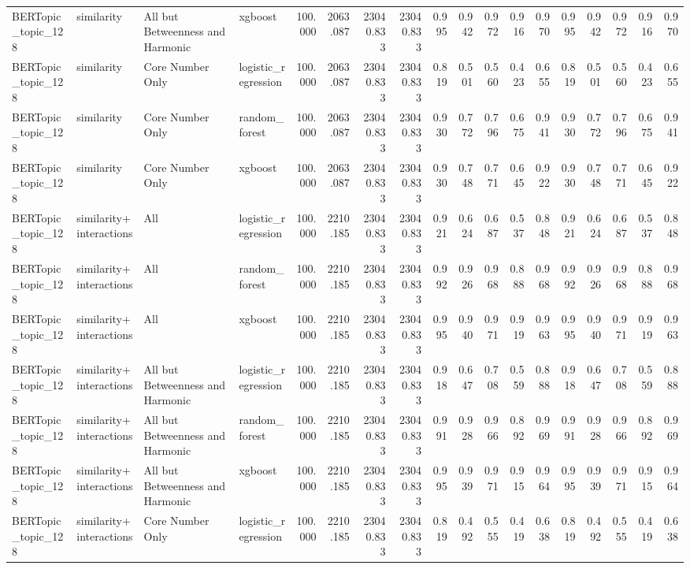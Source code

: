 \begin{tabular}{llllrrrrrrrrrrrrrr}
BERTopic_topic_128 & similarity & All but Betweenness and Harmonic & xgboost & 100.000 & 2063.087 & 23040.833 & 23040.833 & 0.995 & 0.942 & 0.972 & 0.916 & 0.970 & 0.995 & 0.942 & 0.972 & 0.916 & 0.970 \\
BERTopic_topic_128 & similarity & Core Number Only & logistic_regression & 100.000 & 2063.087 & 23040.833 & 23040.833 & 0.819 & 0.501 & 0.560 & 0.423 & 0.655 & 0.819 & 0.501 & 0.560 & 0.423 & 0.655 \\
BERTopic_topic_128 & similarity & Core Number Only & random_forest & 100.000 & 2063.087 & 23040.833 & 23040.833 & 0.930 & 0.772 & 0.796 & 0.675 & 0.941 & 0.930 & 0.772 & 0.796 & 0.675 & 0.941 \\
BERTopic_topic_128 & similarity & Core Number Only & xgboost & 100.000 & 2063.087 & 23040.833 & 23040.833 & 0.930 & 0.748 & 0.771 & 0.645 & 0.922 & 0.930 & 0.748 & 0.771 & 0.645 & 0.922 \\
BERTopic_topic_128 & similarity+interactions & All & logistic_regression & 100.000 & 2210.185 & 23040.833 & 23040.833 & 0.921 & 0.624 & 0.687 & 0.537 & 0.848 & 0.921 & 0.624 & 0.687 & 0.537 & 0.848 \\
BERTopic_topic_128 & similarity+interactions & All & random_forest & 100.000 & 2210.185 & 23040.833 & 23040.833 & 0.992 & 0.926 & 0.968 & 0.888 & 0.968 & 0.992 & 0.926 & 0.968 & 0.888 & 0.968 \\
BERTopic_topic_128 & similarity+interactions & All & xgboost & 100.000 & 2210.185 & 23040.833 & 23040.833 & 0.995 & 0.940 & 0.971 & 0.919 & 0.963 & 0.995 & 0.940 & 0.971 & 0.919 & 0.963 \\
BERTopic_topic_128 & similarity+interactions & All but Betweenness and Harmonic & logistic_regression & 100.000 & 2210.185 & 23040.833 & 23040.833 & 0.918 & 0.647 & 0.708 & 0.559 & 0.888 & 0.918 & 0.647 & 0.708 & 0.559 & 0.888 \\
BERTopic_topic_128 & similarity+interactions & All but Betweenness and Harmonic & random_forest & 100.000 & 2210.185 & 23040.833 & 23040.833 & 0.991 & 0.928 & 0.966 & 0.892 & 0.969 & 0.991 & 0.928 & 0.966 & 0.892 & 0.969 \\
BERTopic_topic_128 & similarity+interactions & All but Betweenness and Harmonic & xgboost & 100.000 & 2210.185 & 23040.833 & 23040.833 & 0.995 & 0.939 & 0.971 & 0.915 & 0.964 & 0.995 & 0.939 & 0.971 & 0.915 & 0.964 \\
BERTopic_topic_128 & similarity+interactions & Core Number Only & logistic_regression & 100.000 & 2210.185 & 23040.833 & 23040.833 & 0.819 & 0.492 & 0.555 & 0.419 & 0.638 & 0.819 & 0.492 & 0.555 & 0.419 & 0.638 \\

\end{tabular}
